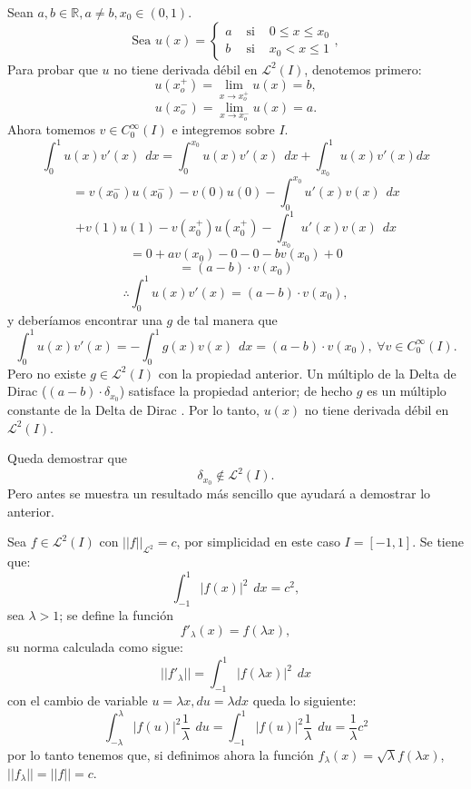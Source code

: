 \documentclass[12pt,spanish,oneside]{book}
\theoremstyle{plain}
\numberwithin{equation}{chapter}
\theoremstyle{definition}
\theoremstyle{remark}
\newcommand{\re}{\mathbb{R}}
\newcommand{\LD}{\mathcal{L}^2}
\newcommand{\cz}{C_{\scriptscriptstyle{0}}^{\scriptscriptstyle{\infty}}}
\newcommand{\icu}{\int_0^1}
\newcommand{\dx}{\hspace{5pt} dx}
\begin{document}
Sean $a,b\in \re, a\neq b, x_0\in (0,1)$.
\[\text{Sea } u(x)=\left \lbrace \begin{array}{ccc} a &\text{ si } & 0\leq x\leq x_0 \\ b &\text{ si } & x_0< x\leq 1 \end{array}\right. ,\]
Para probar que $u$ no tiene derivada débil en $\LD(I)$, denotemos primero: 
\[u(x_o^+)=\lim_{x\rightarrow x_o^+}u(x)=b ,\]\[ u(x_o^-)=\lim_{x\rightarrow x_o^-}u(x)=a. \]
Ahora tomemos $v\in \cz(I)$ e integremos sobre $I$.
\[\icu u(x)v'(x)\dx=\int_0^{x_0}u(x)v'(x)\dx +\int_{x_0}^1 u(x)v'(x)dx\]
\[=v(x_0^-)u(x_0^-)-v(0)u(0)-\int_0^{x_0}u'(x)v(x)\dx\]
\[+v(1)u(1)-v(x_0^+)u(x_0^+)-\int_{x_0}^1 u'(x)v(x)\dx \]
\[= 0+a v(x_0)-0-0-bv(x_0)+0 \]
\[= (a-b)\cdot v(x_0)\]
\[\therefore \icu u(x)v'(x)=(a-b)\cdot v(x_0),\]
y deberíamos encontrar una $g$ de tal manera que
\[ \icu u(x)v'(x)=-\icu g(x) v(x)\dx =(a-b)\cdot v(x_0), \hspace{3pt} \forall v \in C_0^{\infty} (I). \]
Pero no existe $g \in \LD(I)$ con la propiedad anterior. Un múltiplo de la Delta de Dirac ($(a-b)\cdot \delta_{x_0}$) satisface la propiedad anterior; de hecho $g$ es un múltiplo constante de la Delta de Dirac . Por lo tanto, $u(x)$ no tiene derivada débil en $\LD(I)$. 

Queda demostrar que
\begin{equation}
\delta_{x_0}\notin\mathcal{L}^2(I).\label{deltanotin}
\end{equation}
Pero antes se muestra un resultado más sencillo que ayudará a demostrar lo anterior.

Sea $f\in\LD(I)$ con $||f||_{\LD}=c$, por simplicidad en este caso $I=[-1,1]$. Se tiene que: 
\[\int_{-1}^1|f(x)|^2\dx=c^2,\]sea $\lambda>1$; se define la función 
\begin{equation}
f'_{\lambda}(x)=f(\lambda x),\label{flambda}
\end{equation}
su norma calculada como sigue:
\[||f'_{\lambda}||=\int_{-1}^1|f(\lambda x)|^2\dx \] con el cambio de variable $u=\lambda x, du=\lambda dx$ queda lo siguiente: 
\[\int_{-\lambda}^{\lambda}|f(u)|^2\frac{1}{\lambda} \hspace{5pt} du =\int_{-1}^{1}|f(u)|^2\frac{1}{\lambda} \hspace{5pt} du =  \frac{1}{\lambda}c^2 \]
por lo tanto tenemos que, si definimos ahora la función $f_{\lambda}(x)=\sqrt{\lambda} f(\lambda x)$, $||f_{\lambda}||=||f||=c$.
\end{document}

